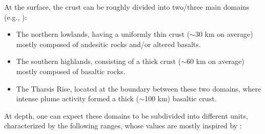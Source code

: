 At the surface, the crust can be roughly divided into two/three main domains (e.g., \citep{Solomon1982,Zuber2000,McSween2003}):
\begin{itemize}
  \item The northern lowlands, having a uniformly thin crust ($\sim$30 km on average) mostly composed of andesitic rocks and/or altered basalts.
  \item The southern highlands, consisting of a thick crust ($\sim$60 km on average) mostly composed of basaltic rocks. 
  \item The Tharsis Rise, located at the boundary between these two domains, where intense plume activity formed a thick ($\sim$100 km) basaltic crust.
\end{itemize}


At depth, one can expect these domains to be subdivided into different units, characterized by the following ranges, whose values are mostly inspired by \citet{Mavko2009}: 
